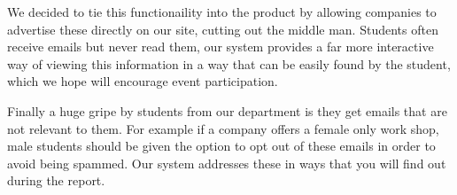 We decided to tie this functionaility into the product by allowing companies to advertise these directly on our site, cutting out the middle man.
Students often receive emails but never read them, our system provides a far more interactive way of viewing this information in a way that can be easily found by the student, which we hope will encourage event participation.

Finally a huge gripe by students from our department is they get emails that are not relevant to them. For example if a company offers a female only work shop, male students should be given the option to opt out of these emails in order to avoid being spammed. Our system addresses these in ways that you will find out during the report.